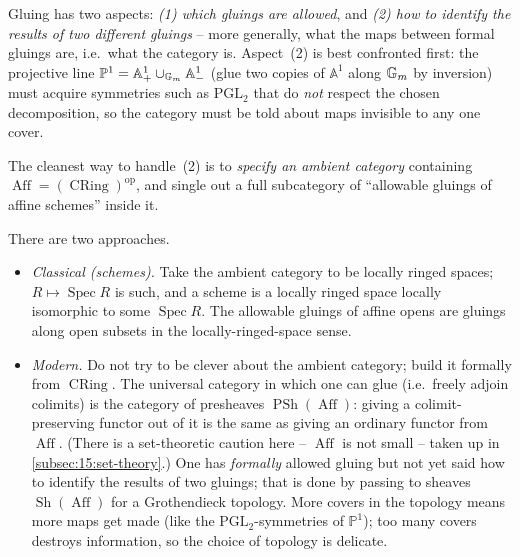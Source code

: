 \begin{remark}
\label{rmk:15:two-aspects}
Gluing has two aspects: \emph{(1) which gluings are allowed}, and \emph{(2) how to
identify the results of two different gluings} -- more generally, what the maps
between formal gluings are, i.e.\ what the category is. Aspect~(2) is best confronted
first: the projective line $\mathbb{P}^1 = \mathbb{A}^1_+ \cup_{\mathbb{G}_{m}} \mathbb{A}^1_-$
(glue two copies of $\mathbb{A}^1$ along $\mathbb{G}_{m}$ by inversion) must acquire symmetries
such as $\mathrm{PGL}_2$ that do \emph{not} respect the chosen decomposition, so the
category must be told about maps invisible to any one cover.
\end{remark}

The cleanest way to handle~(2) is to \emph{specify an ambient category} containing
$\operatorname{Aff} = (\operatorname{CRing})^{\mathrm{op}}$, and single out a full
subcategory of ``allowable gluings of affine schemes'' inside it.

\begin{remark}
\label{rmk:15:classical-modern}
There are two approaches.
\begin{itemize}
\item \emph{Classical (schemes).} Take the ambient category to be locally ringed
spaces; $R\mapsto \operatorname{Spec} R$ is such, and a scheme is a locally ringed
space locally isomorphic to some $\operatorname{Spec} R$. The allowable gluings of
affine opens are gluings along open subsets in the locally-ringed-space sense.
\item \emph{Modern.} Do not try to be clever about the ambient category; build it
formally from $\operatorname{CRing}$. The universal category in which one can glue
(i.e.\ freely adjoin colimits) is the category of presheaves
$\operatorname{PSh}(\operatorname{Aff})$: giving a colimit-preserving functor out of
it is the same as giving an ordinary functor from $\operatorname{Aff}$. (There is a
set-theoretic caution here -- $\operatorname{Aff}$ is not small -- taken up in
\cref{subsec:15:set-theory}.) One has \emph{formally} allowed gluing but not yet said
how to identify the results of two gluings; that is done by passing to sheaves
$\operatorname{Sh}(\operatorname{Aff})$ for a Grothendieck topology. More covers in
the topology means more maps get made (like the $\mathrm{PGL}_2$-symmetries of
$\mathbb{P}^1$); too many covers destroys information, so the choice of topology is
delicate.
\end{itemize}
\end{remark}

